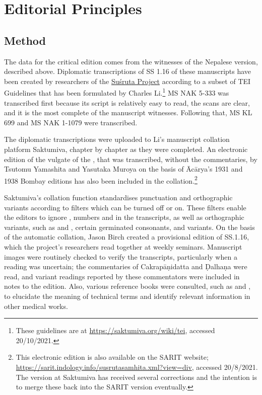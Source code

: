 
\section{Editorial Principles}
\subsection{Method}

The data for the critical edition comes from the witnesses of the Nepalese
version, described above. Diplomatic transcriptions of SS 1.16 of these
manuscripts have been created by researchers of the
\href{https://sushrutaproject.org}{Suśruta
    Project}\space%
according to a subset of TEI Guidelines that has been formulated by Charles
Li.\footnote{These guidelines are at \url{https://saktumiva.org/wiki/tei},
accessed 20/10/2021.} MS NAK 5-333 was transcribed first because its script is
relatively easy to read, the scans are clear, and it is the most complete of
the manuscript witnesses. Following that, MS KL 699 and MS NAK 1-1079 were
transcribed.

The diplomatic transcriptions were uploaded to Li's manuscript collation platform
Saktumiva, chapter by chapter as they were completed. An electronic edition of the
vulgate of the \SS, that was transcribed, without the commentaries, by Tsutomu
Yamashita and Yasutaka Muroya on the basis of Ācārya's 1931 and 1938 Bombay
editions has also been included in the collation.\footnote{This electronic edition
is also available on the SARIT website;
\url{https://sarit.indology.info/susrutasamhita.xml?view=div}, accessed
20/8/2021. The version at Saktumiva has received several corrections and the intention is 
to merge these back into the SARIT version eventually.}

Saktumiva's  collation function standardises punctuation and 
orthographic variants according to filters which can be turned off or on. These 
filters enable the editors to ignore , numbers and 
 in the transcripts, as well as orthographic variants, such as 
 and , certain germinated consonants, and  
variants. On the basis of the automatic collation, Jason Birch created a provisional 
edition of SS.1.16, which the project's researchers read together at weekly 
seminars. Manuscript images were routinely checked to verify the transcripts, 
particularly when a reading was uncertain; the commentaries of Cakrapāṇidatta 
and Ḍalhaṇa were read, and variant readings reported by these commentators 
were included in notes to the edition. Also, various reference books were 
consulted, such as   \citet{josi-maha,nadk-1954} and \citet{meul-hist}, to 
elucidate the meaning of technical terms and identify relevant information in 
other medical works. 

